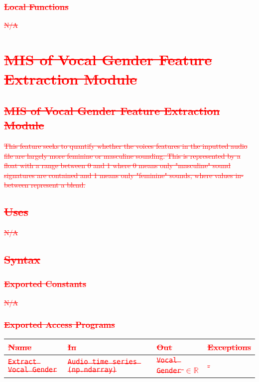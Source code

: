 \documentclass[12pt, titlepage]{article}
\begin{document}
\subsubsection{\textcolor{red}{\sout{Local Functions}}}
\textcolor{red}{\sout{N/A}}

\section{\textcolor{red}{\sout{MIS of Vocal Gender Feature Extraction Module}}} 

\subsection{\textcolor{red}{\sout{MIS of Vocal Gender Feature Extraction Module}}}
\textcolor{red}{\sout{This feature seeks to quantify whether the voices features in the inputted audio file 
are largely more feminine or masculine sounding. This is represented by a float with a range between
0 and 1 where 0 means only "masculine" sound signatures are contained and 1 means only "feminine" sounds,
where values in-between represent a blend.}}

\subsection{\textcolor{red}{\sout{Uses}}}
\textcolor{red}{\sout{N/A}}

\subsection{\textcolor{red}{\sout{Syntax}}}

\subsubsection{\textcolor{red}{\sout{Exported Constants}}}
\textcolor{red}{\sout{N/A}}

\subsubsection{\textcolor{red}{\sout{Exported Access Programs}}}

\begin{center}
\begin{tabular}{p{2cm} p{4cm} p{4cm} p{2cm}}
\hline
\textcolor{red}{\sout{\textbf{Name}}} & \textcolor{red}{\sout{\textbf{In}}} & \textcolor{red}{\sout{\textbf{Out}}} & \textcolor{red}{\sout{\textbf{Exceptions}}}\\
\hline
\textcolor{red}{\sout{\texttt{Extract Vocal Gender}}} & \textcolor{red}{\sout{\texttt{Audio time series (np.ndarray)}}} & \textcolor{red}{\sout{\texttt{Vocal Gender} $\in \mathbb{R}$}} & \textcolor{red}{\sout{-}}\\
\hline
\end{tabular}
\end{center}
\end{document}
